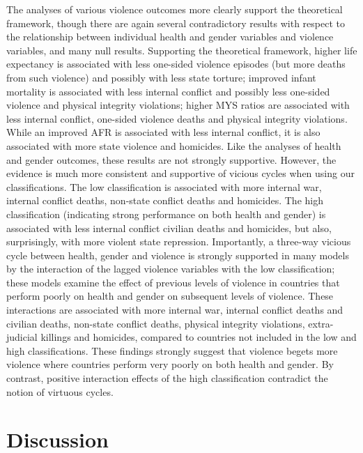 \documentclass[12pt]{article}
\begin{document}
The analyses of various violence outcomes more clearly support the theoretical framework, though there are again several contradictory results with respect to the relationship between individual health and gender variables and violence variables, and many null results. Supporting the theoretical framework, higher life expectancy is associated with less one-sided violence episodes (but more deaths from such violence) and possibly with less state torture; improved infant mortality is associated with less internal conflict and possibly less one-sided violence and physical integrity violations; higher MYS ratios are associated with less internal conflict, one-sided violence deaths and physical integrity violations. While an improved AFR is associated with less internal conflict, it is also associated with more state violence and homicides. Like the analyses of health and gender outcomes, these results are not strongly supportive.
However, the evidence is much more consistent and supportive of vicious cycles when using our classifications. The low classification is associated with more internal war, internal conflict deaths, non-state conflict deaths and homicides. The high classification (indicating strong performance on both health and gender) is associated with less internal conflict civilian deaths and homicides, but also, surprisingly, with more violent state repression. Importantly, a three-way vicious cycle between health, gender and violence is strongly supported in many models by the interaction of the lagged violence variables with the low classification; these models examine the effect of previous levels of violence in countries that perform poorly on health and gender on subsequent levels of violence. These interactions are associated with more internal war, internal conflict deaths and civilian deaths, non-state conflict deaths, physical integrity violations, extra-judicial killings and homicides, compared to countries not included in the low and high classifications. These findings strongly suggest that violence begets more violence where countries perform very poorly on both health and gender. By contrast, positive interaction effects of the high classification contradict the notion of virtuous cycles.

\section{Discussion}
\end{document}
